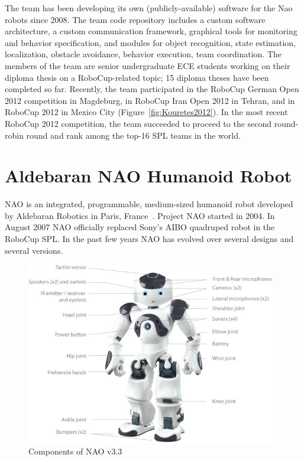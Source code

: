 The team has been developing its own (publicly-available) software for the Nao robots since 2008. The team code repository includes a custom software architecture, a custom communication framework, graphical tools for monitoring and behavior specification, and modules for object recognition, state estimation, localization, obstacle avoidance, behavior execution, team coordination. The members of the team are senior undergraduate ECE students working on their diploma thesis on a RoboCup-related topic; 15 diploma theses have been completed so far. Recently, the team participated in the RoboCup German Open 2012 competition in Magdeburg, in RoboCup Iran Open 2012 in Tehran, and in RoboCup 2012 in Mexico City (Figure~\ref{fig:Kouretes2012}). In the most recent RoboCup 2012 competition, the team succeeded to proceed to the second round-robin round and rank among the top-16 SPL teams in the world.

\section{Aldebaran NAO Humanoid Robot}
NAO is an integrated, programmable, medium-sized humanoid robot developed by Aldebaran Robotics in Paris, France~\cite{naopaper}. Project NAO started in 2004. In August 2007 NAO officially replaced Sony's AIBO quadruped robot in the RoboCup SPL. In the past few years NAO has evolved over several designs and several versions. 

\begin{figure}[t!]
	\begin{center}
		\includegraphics[height = 8cm]{Figures/nao.jpg}
 		\caption{Components of NAO v3.3}
 		\label{fig:sensors}
	\end{center}
\end{figure}

